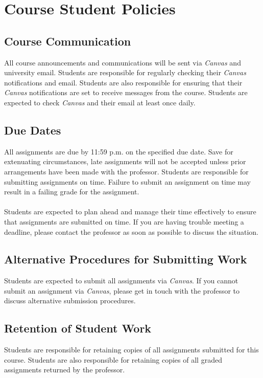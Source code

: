 \documentclass[11pt, letterpaper]{article}
\begin{document}
\section{Course Student Policies}

\subsection*{Course Communication}
All course announcements and communications will be sent via \emph{Canvas} and university email. Students are responsible for regularly checking their \emph{Canvas} notifications and email. Students are also responsible for ensuring that their \emph{Canvas} notifications are set to receive messages from the course. Students are expected to check \emph{Canvas} and their email at least once daily.

\subsection*{Due Dates}
All assignments are due by 11:59 p.m. on the specified due date. Save for extenuating circumstances, late assignments will not be accepted unless prior arrangements have been made with the professor. Students are responsible for submitting assignments on time. Failure to submit an assignment on time may result in a failing grade for the assignment. 
\vspace{1ex}
\paragraph{} Students are expected to plan ahead and manage their time effectively to ensure that assignments are submitted on time. If you are having trouble meeting a deadline, please contact the professor as soon as possible to discuss the situation.

\subsection*{Alternative Procedures for Submitting Work}
Students are expected to submit all assignments via \emph{Canvas}. If you cannot submit an assignment via \emph{Canvas}, please get in touch with the professor to discuss alternative submission procedures.

\subsection*{Retention of Student Work}
Students are responsible for retaining copies of all assignments submitted for this course. Students are also responsible for retaining copies of all graded assignments returned by the professor.
\end{document}
